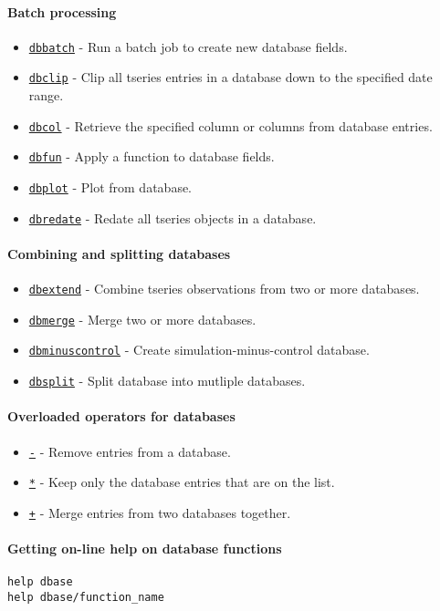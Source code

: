 \paragraph{Batch processing}\label{batch-processing}

\begin{itemize}
\itemsep1pt\parskip0pt
\item
  \href{dbase/dbbatch}{\texttt{dbbatch}} - Run a batch job to create new
  database fields.
\item
  \href{dbase/dbclip}{\texttt{dbclip}} - Clip all tseries entries in a
  database down to the specified date range.
\item
  \href{dbase/dbcol}{\texttt{dbcol}} - Retrieve the specified column or
  columns from database entries.
\item
  \href{dbase/dbfun}{\texttt{dbfun}} - Apply a function to database
  fields.
\item
  \href{dbase/dbplot}{\texttt{dbplot}} - Plot from database.
\item
  \href{dbase/dbredate}{\texttt{dbredate}} - Redate all tseries objects
  in a database.
\end{itemize}

\paragraph{Combining and splitting
databases}\label{combining-and-splitting-databases}

\begin{itemize}
\itemsep1pt\parskip0pt
\item
  \href{dbase/dbextend}{\texttt{dbextend}} - Combine tseries
  observations from two or more databases.
\item
  \href{dbase/dbmerge}{\texttt{dbmerge}} - Merge two or more databases.
\item
  \href{dbase/dbminuscontrol}{\texttt{dbminuscontrol}} - Create
  simulation-minus-control database.
\item
  \href{dbase/dbsplit}{\texttt{dbsplit}} - Split database into mutliple
  databases.
\end{itemize}

\paragraph{Overloaded operators for
databases}\label{overloaded-operators-for-databases}

\begin{itemize}
\itemsep1pt\parskip0pt
\item
  \href{dbase/dbminus}{\texttt{-}} - Remove entries from a database.
\item
  \href{dbase/dbmtimes}{\texttt{*}} - Keep only the database entries
  that are on the list.
\item
  \href{dbase/dbplus}{\texttt{+}} - Merge entries from two databases
  together.
\end{itemize}

\paragraph{Getting on-line help on database
functions}\label{getting-on-line-help-on-database-functions}

\begin{verbatim}
help dbase
help dbase/function_name
\end{verbatim}



